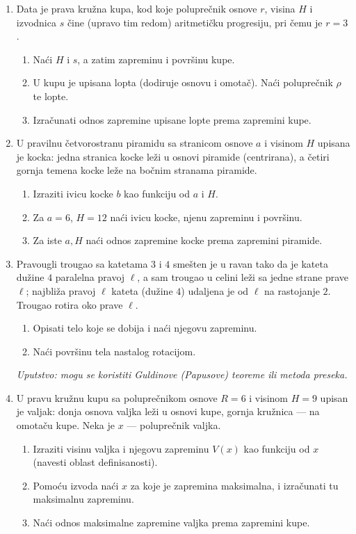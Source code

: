 \begin{enumerate}[label=\arabic*.]
\item Data je prava kružna kupa, kod koje poluprečnik osnove $r$, visina $H$ i izvodnica $s$ čine (upravo tim redom) aritmetičku progresiju, pri čemu je $r=3$.
\begin{enumerate}[label=\alph*)]
\item Naći $H$ i $s$, a zatim zapreminu i površinu kupe.
\item U kupu je upisana lopta (dodiruje osnovu i omotač). Naći poluprečnik $\rho$ te lopte.
\item Izračunati odnos zapremine upisane lopte prema zapremini kupe.
\end{enumerate}

\item U pravilnu četvorostranu piramidu sa stranicom osnove $a$ i visinom $H$ upisana je kocka: jedna stranica kocke leži u osnovi piramide (centrirana), a četiri gornja temena kocke leže na bočnim stranama piramide.
\begin{enumerate}[label=\alph*)]
\item Izraziti ivicu kocke $b$ kao funkciju od $a$ i $H$.
\item Za $a=6$, $H=12$ naći ivicu kocke, njenu zapreminu i površinu.
\item Za iste $a,H$ naći odnos zapremine kocke prema zapremini piramide.
\end{enumerate}

\item Pravougli trougao sa katetama $3$ i $4$ smešten je u ravan tako da je kateta dužine $4$ paralelna pravoj $\ell$, a sam trougao u celini leži sa jedne strane prave $\ell$; najbliža pravoj $\ell$ kateta (dužine $4$) udaljena je od $\ell$ na rastojanje $2$. Trougao rotira oko prave $\ell$.
\begin{enumerate}[label=\alph*)]
\item Opisati telo koje se dobija i naći njegovu zapreminu.
\item Naći površinu tela nastalog rotacijom.
\end{enumerate}
\emph{Uputstvo: mogu se koristiti Guldinove (Papusove) teoreme ili metoda preseka.}

\item U pravu kružnu kupu sa poluprečnikom osnove $R=6$ i visinom $H=9$ upisan je valjak: donja osnova valjka leži u osnovi kupe, gornja kružnica — na omotaču kupe. Neka je $x$ — poluprečnik valjka.
\begin{enumerate}[label=\alph*)]
\item Izraziti visinu valjka i njegovu zapreminu $V(x)$ kao funkciju od $x$ (navesti oblast definisanosti).
\item Pomoću izvoda naći $x$ za koje je zapremina maksimalna, i izračunati tu maksimalnu zapreminu.
\item Naći odnos maksimalne zapremine valjka prema zapremini kupe.
\end{enumerate}


\end{enumerate}
